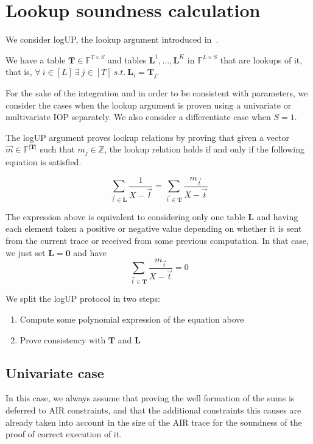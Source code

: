 \newpage
\section{Lookup soundness calculation}

We consider logUP, the lookup argument introduced in~\cite{habock2022logup}. 

We have a table $\mathbf{T}\in\mathbb{F}^{T\times S}$ and tables $\mathbf{L}^1, \ldots, \mathbf{L}^K$ in $\mathbb{F}^{L\times S}$ that are lookups of it, that is, $\forall \ i\in[L] \ \exists \ j\in[T] \ s.t. \ \mathbf L_i=\mathbf T_j$.

For the sake of the integration and in order to be consistent with parameters, we consider the cases when the lookup argument is proven using a univariate or multivariate IOP separately. We also consider a differentiate case when $S=1$.

The logUP argument proves lookup relations by proving that given a vector $\vec m\in\mathbb{F}^{|\mathbf T|}$ such that $m_j\in\mathbb{Z}$, the lookup relation holds if and only if the following equation is satisfied.

$$\sum_{\vec l\in\mathbf{L}} \frac{1}{X-  \vec l}=\sum_{\vec t \in \mathbf{T}} \frac{m_{\vec t}}{X- \vec t}$$

The expression above is equivalent to considering only one table $\mathbf L$ and having each element taken a positive or negative value depending on whether it is sent from the current trace or received from some previous computation. In that case, we just set $\mathbf{L}=\mathbf 0$ and have
$$\sum_{\vec t \in \mathbf{T}} \frac{m_{\vec t}}{X- \vec t}=0$$

We split the logUP protocol in two steps:

\begin{enumerate}
	\item Compute some polynomial expression of the equation above
	\item Prove consistency with $\mathbf T$ and $\mathbf L$	
\end{enumerate}



\subsection{Univariate case}

In this case, we always assume that proving the well formation of the sums is deferred to AIR constraints, and that the additional constraints this causes are already taken into account in the size of the AIR trace for the soundness of the proof of correct execution of it.

